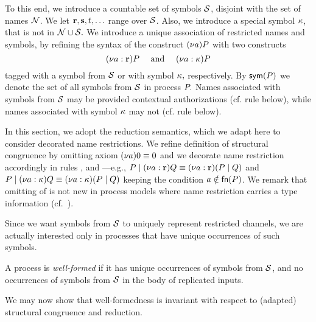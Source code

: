 To this end, we introduce a countable set of symbols $\cal{S}$, disjoint with the set of names ${\cal N}$. We let ${\mathbf{r}}, {\mathbf{s}}, t, \ldots$ range over $\cal{S}$. Also, we introduce a special symbol ${\mathbf{\kappa}}$, that is not in ${\cal N}\cup\cal{S}.$ We introduce a unique association of restricted names and symbols, by refining the syntax of the construct $(\nu a)P$ with two constructs 
\[
   {(\nu a: {\mathbf{r}})P \quad \text{ and } \quad (\nu a: {\mathbf{\kappa}})P}
 \]
 tagged with a symbol from $\cal{S}$ or with symbol ${\mathbf{\kappa}},$ respectively. By $\mathsf{sym}(P)$ we denote the set of all symbols from $\cal{S}$ in process $P.$ Names associated with symbols from $\cal{S}$ may be provided contextual authorizations (cf. rule  below), while names associated with symbol ${\mathbf{\kappa}}$ may not (cf. rule  below). 

In this section, we adopt the reduction semantics, which we adapt here to consider decorated name restrictions. We refine definition of structural congruence by omitting axiom  
$(\nu a)0\equiv0$
and we decorate name restriction accordingly in rules ,  and ---e.g., $P\;|\;(\nu a: {\mathbf{r}})Q\equiv(\nu a: {\mathbf{r}})(P\;|\;Q)$ and $P\;|\;(\nu a: {\mathbf{\kappa}})Q\equiv(\nu a: {\mathbf{\kappa}})(P\;|\;Q)$ keeping the condition $a\notin\mathsf{fn}(P)$. We remark that omitting of  is not new in process models where name restriction carries a type information (cf.~\cite{Boreale2010}). 

Since we want symbols from ${\cal S}$ to uniquely represent restricted channels, we are actually interested only in processes that have unique occurrences of such symbols. 
\begin{definition}
A process is \emph{well-formed} %
if it has unique occurrences of symbols from $\cal{S}$, and no occurrences of symbols from $\cal{S}$ in the body of replicated inputs.
\end{definition}
We may now show that well-formedness is invariant with respect to (adapted) structural congruence and reduction.


